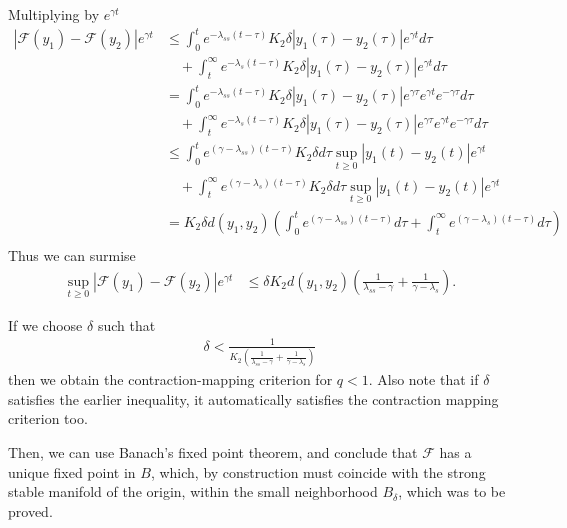 \begin{solution}[9.8]
Multiplying by $e^{\gamma t}$
\begin{align}
    |\mathcal{F}(y_1) - \mathcal{F}(y_2)|e^{\gamma t} &\leq \int_{0}^t e^{-\lambda_{ss}(t-\tau)}K_2 \delta |y_1(\tau) - y_2(\tau)|e^{\gamma t}d\tau  \\
						      &\quad+  \int_{t}^\infty e^{-\lambda_s(t-\tau)}K_2\delta |y_1(\tau) - y_2(\tau) |e^{\gamma t} d\tau  \\
    & = \int_{0}^t e^{-\lambda_{ss}(t-\tau)}K_2 \delta |y_1(\tau) - y_2(\tau)|e^{\gamma \tau} e^{\gamma t} e^{-\gamma \tau}d\tau  \\
    &\quad+ \int_{t}^\infty e^{-\lambda_s(t-\tau)}K_2\delta |y_1(\tau) - y_2(\tau) |e^{\gamma \tau} e^{\gamma t} e^{-\gamma \tau} d\tau \\
    &\leq \int_{0}^t e^{(\gamma-\lambda_{ss})(t-\tau)}K_2 \delta d\tau \sup_{t\geq 0} |y_1(t) - y_2(t) |e^{\gamma t}  \\
    &\quad+ \int_{t}^\infty e^{(\gamma-\lambda_s)(t-\tau)}K_2\delta d\tau \sup_{t\geq 0} |y_1(t) - y_2(t) |e^{\gamma t} \\
    & = K_2 \delta d(y_1, y_2) \left (\int_{0}^t e^{(\gamma-\lambda_{ss})(t-\tau)}d\tau + \int_{t}^\infty e^{(\gamma-\lambda_s)(t-\tau)} d\tau \right) \\
    \end{align}
    Thus we can surmise
\begin{align}
    \sup_{t\geq0}|\mathcal{F}(y_1) - \mathcal{F}(y_2)|e^{\gamma t}&\leq \delta K_2 d(y_1, y_2) \left( \frac{1}{\lambda_{ss} - \gamma} + \frac{1}{\gamma - \lambda_{s} }\right).
\end{align}

If we choose $\delta$ such that 
\begin{align}
\delta < \frac{1}{K_2 \left( \frac{1}{\lambda_{ss} - \gamma} + \frac{1}{\gamma - \lambda_{s} }\right)}
\end{align}
then we obtain the contraction-mapping criterion for $q<1$. Also note that if $\delta$ satisfies the earlier inequality, it automatically satisfies the contraction mapping criterion too. 

Then, we can use Banach's fixed point theorem, and conclude that $\mathcal{F}$ has a unique fixed point in $B$, which, by construction must coincide with the strong stable manifold of the origin, within the small neighborhood $B_\delta$, which was to be proved. 


	
\end{solution}

